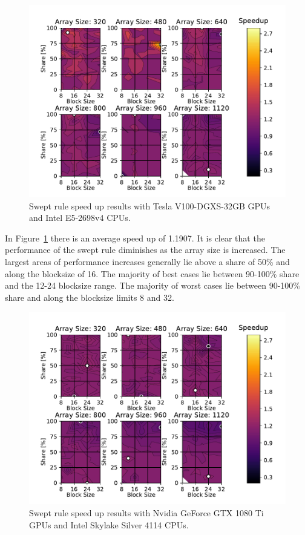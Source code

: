 \documentclass[review]{elsarticle}
\def\oldCPU{s}
\def\oldGPU{s}
\def\newCPU{s}
\def\newGPU{s}
\def\oldCPU{Intel Skylake Silver 4114} %
\def\oldGPU{Nvidia GeForce GTX 1080 Ti}
\def\newCPU{Intel E5-2698v4} %
\def\newGPU{Tesla V100-DGXS-32GB}
\begin{document}
\begin{figure}[htb!]
    \centering
    \includegraphics[scale=0.7]{figs/speedUpheatNew.pdf}
    \caption{Swept rule speed up results with \newGPU{} GPUs and \newCPU{} CPUs.}
    \label{fig:newSpeedup}
\end{figure}

In Figure~\ref{fig:newSpeedup} there is an average speed up of 1.1907. It is clear that the performance of the swept rule diminishes as the array size is increased. The largest areas of performance increases generally lie above a share of 50\% and along the blocksize of 16. The majority of best cases lie between 90-100\% share and the 12-24 blocksize range. The majority of worst cases lie between 90-100\% share and along the blocksize limits 8 and 32.

\begin{figure}[htb!]
    \centering
    \includegraphics[scale=0.7]{figs/speedUpheatOld.pdf}
    \caption{Swept rule speed up results with \oldGPU{} GPUs and \oldCPU{} CPUs.}
    \label{fig:oldSpeedup}
\end{figure}
\end{document}

